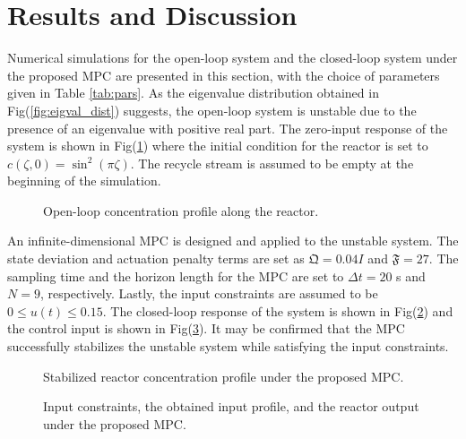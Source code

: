 \section{Results and Discussion}

Numerical simulations for the open-loop system and the closed-loop system under the proposed MPC are presented in this section, with the choice of parameters given in Table \ref{tab:pars}. As the eigenvalue distribution obtained in Fig(\ref{fig:eigval_dist}) suggests, the open-loop system is unstable due to the presence of an eigenvalue with positive real part. The zero-input response of the system is shown in Fig(\ref{fig:openloop_response}) where the initial condition for the reactor is set to $c(\zeta,0) = \sin^2(\pi \zeta)$. The recycle stream is assumed to be empty at the beginning of the simulation.

\begin{figure}[!htbp]
    \centering
    
    \caption{Open-loop concentration profile along the reactor.}
    \label{fig:openloop_response}
\end{figure}

An infinite-dimensional MPC is designed and applied to the unstable system. The state deviation and actuation penalty terms are set as $\mathfrak{Q} = 0.04 I$ and $\mathfrak{F} = 27$. The sampling time and the horizon length for the MPC are set to $\Delta t = 20$ s and $N = 9$, respectively. Lastly, the input constraints are assumed to be $0 \leq u(t) \leq 0.15$. The closed-loop response of the system is shown in Fig(\ref{fig:closedloop_response}) and the control input is shown in Fig(\ref{fig:control_input}). It may be confirmed that the MPC successfully stabilizes the unstable system while satisfying the input constraints.

\begin{figure}[!htbp]
    \centering
    
    \caption{Stabilized reactor concentration profile under the proposed MPC.}
    \label{fig:closedloop_response}
\end{figure}

\begin{figure}[!htbp]
    \centering
    
    \caption{Input constraints, the obtained input profile, and the reactor output under the proposed MPC.}
    \label{fig:control_input}
\end{figure}

